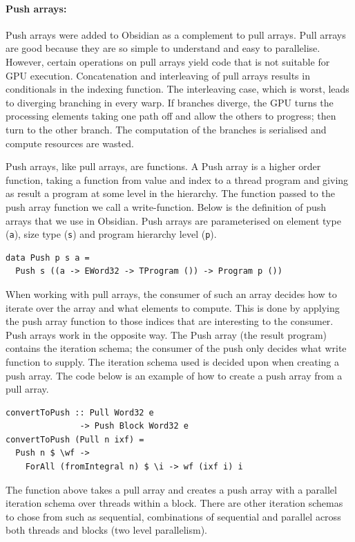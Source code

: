 \documentclass[a4paper]{book}
\begin{document}
 
\paragraph{Push arrays:}

Push arrays were added to Obsidian as a complement to pull arrays. Pull arrays are 
good because they are so simple to understand and easy to parallelise. However, certain
operations on pull arrays yield code that is not suitable for GPU execution. Concatenation 
and interleaving of pull arrays results in conditionals in the indexing function. The 
interleaving case, which is worst, leads to diverging branching in every warp. If branches 
diverge, the GPU turns the processing elements taking one path off and 
allow the others to progress; then turn to the other branch. The computation of the 
branches is serialised and compute resources are wasted. 

Push arrays, like pull arrays, are functions. A Push array is a higher order 
function, taking a function from value and index to a thread program and giving 
as result a program at some level in the hierarchy. The function passed to the 
push array function we call a write-function. Below is the definition of 
push arrays that we use in Obsidian. Push arrays are parameterised on element 
type ({\tt a}), size type ({\tt s}) and program hierarchy level ({\tt p}). 

\begin{verbatim}
data Push p s a =
  Push s ((a -> EWord32 -> TProgram ()) -> Program p ())
\end{verbatim} 

When working with pull arrays, the consumer of such an array decides how to 
iterate over the array and what elements to compute. This is done by applying the 
push array function to those indices that are interesting to the consumer. Push 
arrays work in the opposite way. The Push array (the result program) contains 
the iteration schema; the consumer of the push only decides what write function 
to supply. The iteration schema used is decided upon when creating a push array. 
The code below is an example of how to create a push array from a pull array.

\begin{verbatim} 
convertToPush :: Pull Word32 e 
               -> Push Block Word32 e 
convertToPush (Pull n ixf) =
  Push n $ \wf -> 
    ForAll (fromIntegral n) $ \i -> wf (ixf i) i
\end{verbatim} 

The function above takes a pull array and creates a push array with a parallel 
iteration schema over threads within a block. There are other iteration schemas to 
chose from such as sequential, combinations of sequential and parallel
across both threads and blocks (two level parallelism). 
\end{document}
